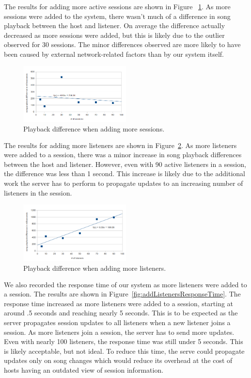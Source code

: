 The results for adding more active sessions are shown in Figure
~\ref{fig:addSessions}. As more sessions were added to the system,
there wasn't much of a difference in song playback between the host
and listener. On average the difference actually decreased as more
sessions were added, but this is likely due to the outlier observed
for 30 sessions. The minor differences observed are more likely to
have been caused by external network-related factors than by our
system itself.

\begin{figure}[h]
	\centering
	\includegraphics[width=0.5\textwidth]{add_sessions.png}
	\caption{Playback difference when adding more sessions.}
	\label{fig:addSessions}
\end{figure}

The results for adding more listeners are shown in Figure~\ref{fig:addListeners}. As more listeners were added to a
session, there was a minor increase in song playback differences
between the host and listener. However, even with 90 active listeners
in a session, the difference was less than 1 second. This increase is
likely due to the additional work the server has to perform to
propagate updates to an increasing number of listeners in the
session.

\begin{figure}[h]
	\centering
	\includegraphics[width=0.5\textwidth]{add_listeners.png}
	\caption{Playback difference when adding more listeners.}
	\label{fig:addListeners}
\end{figure}

We also recorded the response time of our system as more listeners
were added to a session. The results are shown in
Figure~\ref{fig:addListenersResponseTime}. The response time
increased as more listeners were added to a session, starting at
around .5 seconds and reaching nearly 5 seconds. This is to be
expected as the server propagates session updates to all listeners
when a new listener joins a session. As more listeners join a
session, the server has to send more updates. Even with nearly
100 listeners, the response time was still under 5 seconds. This
is likely acceptable, but not ideal. To reduce this time, the serve
could propagate updates only on song changes which would reduce
its overhead at the cost of hosts having an outdated view of
session information.

